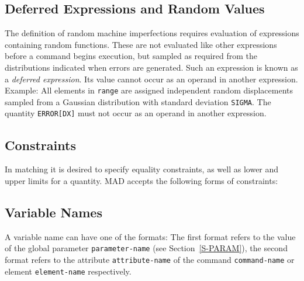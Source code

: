 \subsection{Deferred Expressions and Random Values}
\label{S-DEFAT}
The definition of random machine imperfections requires evaluation
of expressions containing random functions.
These are not evaluated like other expressions before a command
begins execution, but sampled as required from the distributions
indicated when errors are generated.
Such an expression is known as a {\em deferred expression}.
Its value cannot occur as an operand in another expression.
Example:
All elements in {\tt range} are assigned independent random
displacements sampled from a Gaussian distribution
with standard deviation {\tt SIGMA}.
The quantity {\tt ERROR[DX]} must not occur as an operand
in another expression.
 
\subsection{Constraints}
\label{S-CONAT}
In matching it is desired to specify equality constraints,
as well as lower and upper limits for a quantity.
MAD accepts the following forms of constraints:
 
\subsection{Variable Names}
\label{S-VARAT}
A variable name can have one of the formats:
The first format refers to the value of the global parameter
{\tt parameter-name} (see Section~\ref{S-PARAM}),
the second format refers to the attribute {\tt attribute-name}
of the command {\tt command-name}
or element {\tt element-name} respectively.
 
